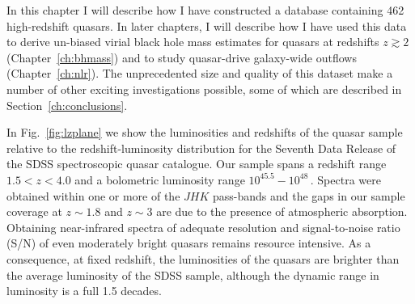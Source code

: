 In this chapter I will describe how I have constructed a database containing 462 high-redshift quasars. 
In later chapters, I will describe how I have used this data to derive un-biased virial black hole mass estimates for quasars at redshifts $z \gtrsim 2$ (Chapter~\ref{ch:bhmass}) and to study quasar-drive galaxy-wide outflows (Chapter~\ref{ch:nlr}). 
The unprecedented size and quality of this dataset make a number of other exciting investigations possible, some of which are described in Section~\ref{ch:conclusions}. 

In Fig.~\ref{fig:lzplane} we show the luminosities and redshifts of the quasar sample relative to the redshift-luminosity distribution for the Seventh Data Release \citep[DR7;][]{schneider10} of the SDSS spectroscopic quasar catalogue.
Our sample spans a redshift range $1.5 < z < 4.0$ and a bolometric luminosity range $10^{45.5}-10^{48}$\,\ergs. 
Spectra were obtained within one or more of the $JHK$ pass-bands and the gaps in our sample coverage at $z\sim1.8$ and $z\sim3$ are due to the presence of atmospheric absorption. 
Obtaining near-infrared spectra of adequate resolution and signal-to-noise ratio (S/N) of even moderately bright quasars remains resource intensive. 
As a consequence, at fixed redshift, the luminosities of the quasars are brighter than the average luminosity of the SDSS sample, although the dynamic range in luminosity is a full 1.5 decades.

